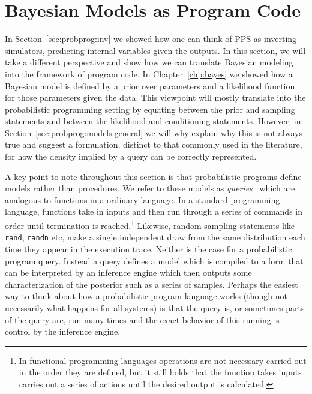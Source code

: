 
\section{Bayesian Models as Program Code}
\label{sec:probprog:models}

In Section~\ref{sec:probprog:inv} we showed how one can think of PPS as inverting simulators, 
predicting internal variables given the outputs.  In this section, we will take a 
different perspective and
show how we can translate Bayesian modeling into the framework of program code.   
In Chapter~\ref{chp:bayes} we showed how a Bayesian model is defined by a prior over
parameters and a likelihood function for those parameters given the data.  This viewpoint will
mostly translate into the probabilistic programming setting by equating between the prior
and sampling statements and between the likelihood and conditioning statements.  However,
in Section~\ref{sec:probprog:models:general} we will why explain why this is not always true
and suggest a formulation, distinct to that commonly used in the literature, for how the 
density implied by a query can be correctly represented.

A key point to note throughout this section is that probabilistic programs define
models rather than procedures.  We refer to these models as \emph{queries}~\citep{goodman2008church} 
which are analogous to functions in a ordinary language.
In a standard programming language, functions take in inputs
and then run through a series of commands in order until termination is reached.\footnote{In functional
	programming languages operations are not necessary carried out in the order they are defined,
	but it still holds that the function takes inputs carries out a series of actions until the desired output
	is calculated.}  Likewise, random sampling statements like {\small \texttt{rand}, \texttt{randn}}
etc, make a single independent draw from the same distribution each time they appear in the execution trace.
Neither is the case for a probabilistic program query.  Instead a  query defines a model
which is compiled to a form that can be interpreted by an inference engine which then
outputs some characterization of the posterior such as a series of samples.  Perhaps the easiest way to think
about how a probabilistic program language works (though not necessarily what happens for all systems) is that
the query is, or sometimes parts of the query are, run many times and the exact behavior
of this running is control by the inference engine.  

